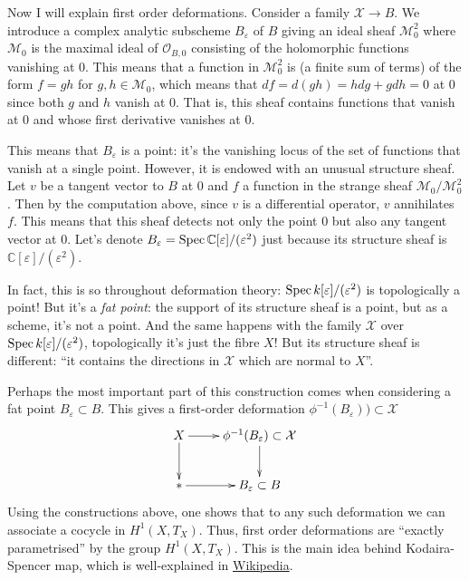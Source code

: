 \medskip\noindent
Now I will explain first order deformations.
Consider a family $\mathcal{X} \to B$.
We introduce a complex analytic subscheme $B_\varepsilon$ of $B$ 
giving an ideal sheaf $\mathcal{M}^2_0$
where $\mathcal{M}_0$ is the maximal ideal
of $\mathcal{O}_{B,0}$ consisting of the holomorphic
functions vanishing at 0.
This means that a function in $\mathcal{M}^2_0$ 
is (a finite sum of terms) of the form $f=gh$ for $g,h \in \mathcal{M}_0$,
which means that $df=d(gh)=hdg+gdh=0$ at $0$
since both $g$ and $h$ vanish at $0$.
That is, this sheaf contains functions that vanish
at $0$ and whose first derivative vanishes at $0$.

This means that $B_\varepsilon$ is a point:
it's the vanishing locus of the set of functions
that vanish at a single point.
However, it is endowed with an unusual structure sheaf.
Let $v$ be a tangent vector to $B$ at $0$ and
$f$ a function in the strange sheaf $\mathcal{M}_0/\mathcal{M}_0^2$.
Then by the computation above, since $v$ is a differential
operator, $v$ annihilates $f$.
This means that this sheaf detects not only the point $0$ 
but also any tangent vector at $0$.
Let's denote
$B_\varepsilon=\mathop{\mathrm{Spec}} \mathbb{C}[\varepsilon]/(\varepsilon^2)$
just because its structure sheaf is 
$\mathbb{C}[\varepsilon]/(\varepsilon^2)$.

In fact, this is so throughout deformation theory:
$\mathop{\mathrm{Spec}} k[\varepsilon]/(\varepsilon^2)$ is topologically a point!
But it's a {\it fat point}: the support of its
structure sheaf is a point, but as a scheme, it's not a point.
And the same happens with the family $\mathcal{X}$ over
$\mathop{\mathrm{Spec}} k[\varepsilon]/(\varepsilon^2)$,
topologically it's just the fibre $X$!
But its structure sheaf is different:
``it contains the directions in $\mathcal{X}$ which
are normal to $X$''.

\medskip\noindent
Perhaps the most important part of this construction
comes when considering a fat point $B_\varepsilon \subset B$.
This gives a first-order deformation
$\phi^{-1}(B_\varepsilon)) \subset \mathcal{X}$ 
$$
\xymatrix{
X\ar[r]\ar[d]
&\phi^{-1}(B_\varepsilon) \subset \mathcal{X}\ar[d]\\
\ast\ar[r]
&B_\varepsilon \subset B
}
$$
Using the constructions above, one shows that
to any such deformation we can associate a cocycle
in $H^1(X,T_X)$.
Thus, first order deformations are ``exactly parametrised''
by the group $H^1(X,T_X)$.
This is the main idea behind Kodaira-Spencer map,
which is well-explained in
\href{https://en.wikipedia.org/wiki/Kodaira%E2%80%93Spencer_map}{Wikipedia}.

